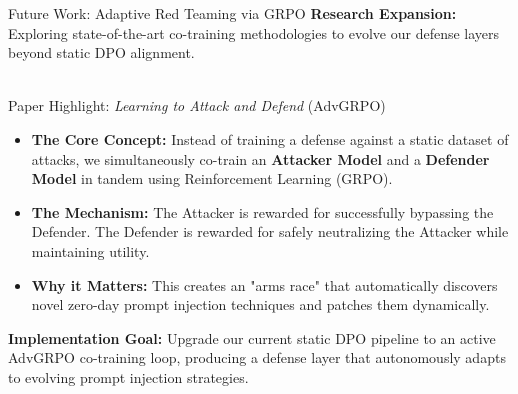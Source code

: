 \documentclass[aspectratio=169]{beamer}
\begin{document}
\begin{frame}{Future Work: Adaptive Red Teaming via GRPO}
    \textbf{Research Expansion:} Exploring state-of-the-art co-training methodologies to evolve our defense layers beyond static DPO alignment. \\~\\
    
    \begin{block}{Paper Highlight: \textit{Learning to Attack and Defend} (AdvGRPO)}
        \begin{itemize}
            \item \textbf{The Core Concept:} Instead of training a defense against a static dataset of attacks, we simultaneously co-train an \textbf{Attacker Model} and a \textbf{Defender Model} in tandem using Reinforcement Learning (GRPO).
            \item \textbf{The Mechanism:} The Attacker is rewarded for successfully bypassing the Defender. The Defender is rewarded for safely neutralizing the Attacker while maintaining utility.
            \item \textbf{Why it Matters:} This creates an "arms race" that automatically discovers novel zero-day prompt injection techniques and patches them dynamically.
        \end{itemize}
    \end{block}
    
    \vspace{0.3cm}
    \textbf{Implementation Goal:} Upgrade our current static DPO pipeline to an active AdvGRPO co-training loop, producing a defense layer that autonomously adapts to evolving prompt injection strategies.
\end{frame}
\end{document}

